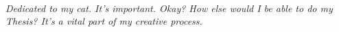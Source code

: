 \tableofcontents

\listoffigures

\listoftables

\cleardoublepage
~\vfill
\begin{doublespace}
\noindent\fontsize{18}{22}\selectfont\itshape
\nohyphenation
Dedicated to my cat. It's important. Okay? How else would I be able to do my Thesis? It's a vital part of my creative process.
\end{doublespace}
\vfill
\vfill